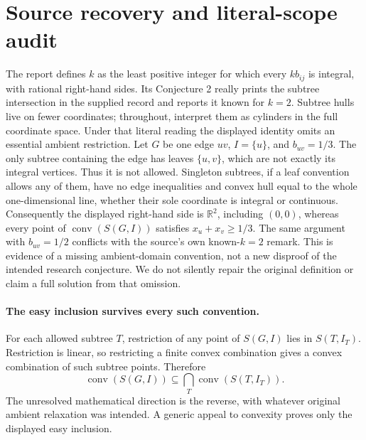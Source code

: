 \documentclass[11pt]{article}
\begin{document}
\section{Source recovery and literal-scope audit}
The report defines $k$ as the least positive integer for which every
$kb_{ij}$ is integral, with rational right-hand sides. Its Conjecture 2
really prints the subtree intersection in the supplied record and reports
it known for $k=2$. Subtree hulls live on fewer coordinates; throughout,
interpret them as cylinders in the full coordinate space.
Under that literal reading the displayed identity omits an essential ambient
restriction. Let $G$ be one edge $uv$, $I=\{u\}$, and $b_{uv}=1/3$.
The only subtree containing the edge has leaves $\{u,v\}$, which are not
exactly its integral vertices. Thus it is not allowed. Singleton subtrees,
if a leaf convention allows any of them, have no edge inequalities and
convex hull equal to the whole one-dimensional line, whether their sole
coordinate is integral or continuous. Consequently the displayed right-hand
side is $\mathbb R^2$, including $(0,0)$, whereas every point of
$\operatorname{conv}(S(G,I))$ satisfies $x_u+x_v\ge1/3$.
The same argument with $b_{uv}=1/2$ conflicts with the source's own known-$k=2$
remark. This is evidence of a missing ambient-domain convention, not a
new disproof of the intended research conjecture. We do not silently repair
the original definition or claim a full solution from that omission.

\paragraph{The easy inclusion survives every such convention.}
For each allowed subtree $T$, restriction of any point of $S(G,I)$ lies
in $S(T,I_T)$. Restriction is linear, so restricting a finite convex
combination gives a convex combination of such subtree points. Therefore
\[
\operatorname{conv}(S(G,I))\subseteq
\bigcap_T\operatorname{conv}(S(T,I_T)).
\]
The unresolved mathematical direction is the reverse, with whatever original
ambient relaxation was intended. A generic appeal to convexity proves only
the displayed easy inclusion.
\end{document}
